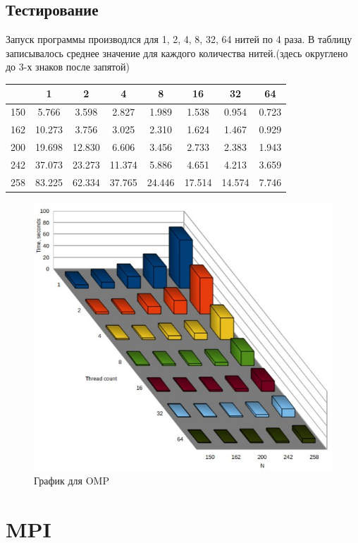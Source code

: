 \documentclass[a4paper,12pt,titlepage,final]{article}
\begin{document}
\subsection{Тестирование}
Запуск программы производлся для 1, 2, 4, 8, 32, 64 нитей по 4 раза. В таблицу записывалось среднее значение для каждого количества нитей.(здесь округлено до 3-х знаков после запятой)\par
\begin{tabular}{|c|c|c|c|c|c|c|c|}
\hline
	& 1 &	2 &	4 &	8 &	16 & 32 & 64\\
    \hline
150 &	5.766 & 3.598 & 2.827 &	1.989 &	1.538 &	0.954 &	0.723\\
    \hline
162 &	10.273 &	3.756 &	3.025 &	2.310 &	1.624 &	1.467 &	0.929\\
    \hline
200 &	19.698 &	12.830 &	6.606 &	3.456 &	2.733 &	2.383 &	1.943\\
    \hline
242 &	37.073 &	23.273 &	11.374 &	5.886 &	4.651 &	4.213 &	3.659\\
    \hline
258 &	83.225 &	62.334 &	37.765 &	24.446 &	17.514 &	14.574 &	7.746\\
    \hline
\end{tabular}
\par

\begin{figure}[h!]
  \includegraphics[width=0.7\linewidth]{omp_graph.jpeg}
  \caption{График для OMP}
  \label{fig:omp_graph}
\end{figure}
\newpage

\section{MPI}
\end{document}
